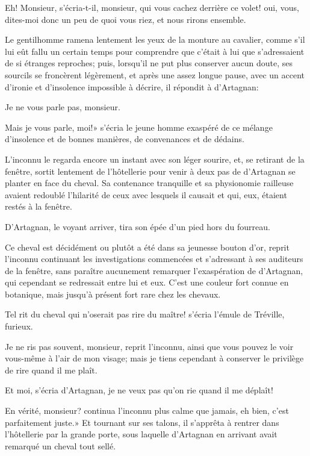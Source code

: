 \speak Eh! Monsieur, s'écria-t-il, monsieur, qui vous cachez derrière ce volet! oui, vous, dites-moi donc un peu de quoi vous riez, et nous rirons ensemble. 

Le gentilhomme ramena lentement les yeux de la monture au cavalier, comme s'il lui eût fallu un certain temps pour comprendre que c'était à lui que s'adressaient de si étranges reproches; puis, lorsqu'il ne put plus conserver aucun doute, ses sourcils se froncèrent légèrement, et après une assez longue pause, avec un accent d'ironie et d'insolence impossible à décrire, il répondit à d'Artagnan: 

\speak Je ne vous parle pas, monsieur. 

\speak Mais je vous parle, moi!» s'écria le jeune homme exaspéré de ce mélange d'insolence et de bonnes manières, de convenances et de dédains. 

L'inconnu le regarda encore un instant avec son léger sourire, et, se retirant de la fenêtre, sortit lentement de l'hôtellerie pour venir à deux pas de d'Artagnan se planter en face du cheval. Sa contenance tranquille et sa physionomie railleuse avaient redoublé l'hilarité de ceux avec lesquels il causait et qui, eux, étaient restés à la fenêtre. 

D'Artagnan, le voyant arriver, tira son épée d'un pied hors du fourreau. 

\speak  Ce cheval est décidément ou plutôt a été dans sa jeunesse bouton d'or, reprit l'inconnu continuant les investigations commencées et s'adressant à ses auditeurs de la fenêtre, sans paraître aucunement remarquer l'exaspération de d'Artagnan, qui cependant se redressait entre lui et eux. C'est une couleur fort connue en botanique, mais jusqu'à présent fort rare chez les chevaux. 

\speak  Tel rit du cheval qui n'oserait pas rire du maître! s'écria l'émule de Tréville, furieux. 

\speak  Je ne ris pas souvent, monsieur, reprit l'inconnu, ainsi que vous pouvez le voir vous-même à l'air de mon visage; mais je tiens cependant à conserver le privilège de rire quand il me plaît. 

\speak  Et moi, s'écria d'Artagnan, je ne veux pas qu'on rie quand il me déplaît! 

\speak  En vérité, monsieur? continua l'inconnu plus calme que jamais, eh bien, c'est parfaitement juste.» Et tournant sur ses talons, il s'apprêta à rentrer dans l'hôtellerie par la grande porte, sous laquelle d'Artagnan en arrivant avait remarqué un cheval tout sellé. 

